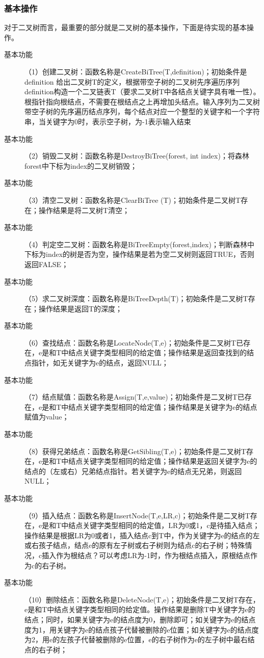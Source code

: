 \documentclass[supercite]{Experimental_Report}
\theoremstyle{definition}
\begin{document}
\subsubsection{基本操作}
对于二叉树而言，最重要的部分就是二叉树的基本操作，下面是待实现的基本操作。
\begin{description}
	\item[基本功能] （1）创建二叉树：函数名称是CreateBiTree(T,definition)；初始条件是definition 给出二叉树T的定义，根据带空子树的二叉树先序遍历序列definition构造一个二叉链表T（要求二叉树T中各结点关键字具有唯一性）。根指针指向根结点，不需要在根结点之上再增加头结点。输入序列为二叉树带空子树的先序遍历结点序列，每个结点对应一个整型的关键字和一个字符串，当关键字为0时，表示空子树，为-1表示输入结束
	\item[基本功能] （2）销毁二叉树：函数名称是DestroyBiTree(forest, int index)；将森林forest中下标为index的二叉树销毁；
	\item[基本功能] （3）清空二叉树：函数名称是ClearBiTree (T)；初始条件是二叉树T存在；操作结果是将二叉树T清空；
	\item[基本功能] （4）判定空二叉树：函数名称是BiTreeEmpty(forest,index)；判断森林中下标为index的树是否为空，操作结果是若为空二叉树则返回TRUE，否则返回FALSE；
	\item[基本功能] （5）求二叉树深度：函数名称是BiTreeDepth(T)；初始条件是二叉树T存在；操作结果是返回T的深度；
	\item[基本功能] （6）查找结点：函数名称是LocateNode(T,e)；初始条件是二叉树T已存在，e是和T中结点关键字类型相同的给定值；操作结果是返回查找到的结点指针，如无关键字为e的结点，返回NULL；
	\item[基本功能] （7）结点赋值：函数名称是Assign(T,e,value)；初始条件是二叉树T已存在，e是和T中结点关键字类型相同的给定值；操作结果是关键字为e的结点赋值为value；
	\item[基本功能] （8）获得兄弟结点：函数名称是GetSibling(T,e)；初始条件是二叉树T存在，e是和T中结点关键字类型相同的给定值；操作结果是返回关键字为e的结点的（左或右）兄弟结点指针。若关键字为e的结点无兄弟，则返回NULL；
	\item[基本功能] （9）插入结点：函数名称是InsertNode(T,e,LR,c)；初始条件是二叉树T存在，e是和T中结点关键字类型相同的给定值，LR为0或1，c是待插入结点；操作结果是根据LR为0或者1，插入结点c到T中，作为关键字为e的结点的左或右孩子结点，结点e的原有左子树或右子树则为结点c的右子树；特殊情况，c插入作为根结点？可以考虑LR为-1时，作为根结点插入，原根结点作为c的右子树。
	\item[基本功能] （10）删除结点：函数名称是DeleteNode(T,e)；初始条件是二叉树T存在，e是和T中结点关键字类型相同的给定值。操作结果是删除T中关键字为e的结点；同时，如果关键字为e的结点度为0，删除即可；如关键字为e的结点度为1，用关键字为e的结点孩子代替被删除的e位置；如关键字为e的结点度为2，用e的左孩子代替被删除的e位置，e的右子树作为e的左子树中最右结点的右子树；

\end{description}
\end{document}
